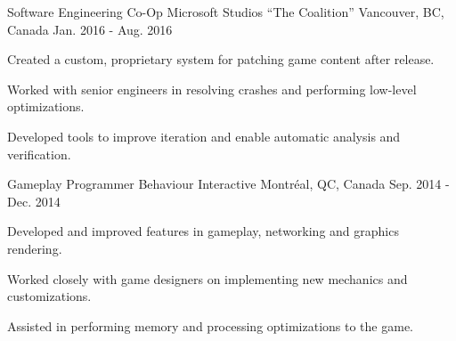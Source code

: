 \begin{cventries}
  \cventry
    {Software Engineering Co-Op} %
    {Microsoft Studios ``The Coalition''} %
    {Vancouver, BC, Canada} %
    {Jan. 2016 - Aug. 2016} %
    {
      \begin{cvitems} %
        \item {Created a custom, proprietary system for patching game content after release.}
        \item {Worked with senior engineers in resolving crashes and performing low-level optimizations.}
        \item {Developed tools to improve iteration and enable automatic analysis and verification.}
        \\
      \end{cvitems}
    }

  \cventry
    {Gameplay Programmer} %
    {Behaviour Interactive} %
    {Montréal, QC, Canada} %
    {Sep. 2014 - Dec. 2014} %
    {
      \begin{cvitems} %
        \item {Developed and improved features in gameplay, networking and graphics rendering.}
        \item {Worked closely with game designers on implementing new mechanics and customizations.}
        \item {Assisted in performing memory and processing optimizations to the game.}
        \\
      \end{cvitems}
    }

\end{cventries}
